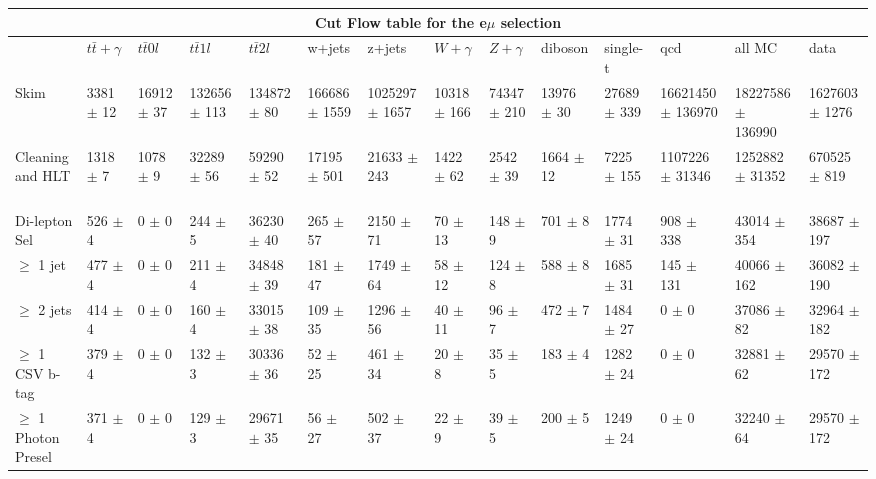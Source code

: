 \begin{table}
  \centering
\resizebox{\columnwidth}{!} {

\begin{tabular}{|l|l|l|l|l|l|l|l|l|l|l|l|l|l|}
\hline
\multicolumn{14}{|c|}{\textbf{Cut Flow table for the e$\mu$ selection}} \\
\hline
 & $t\bar{t}+\gamma$ & $t\bar{t} 0l$ & $t\bar{t} 1l$ & $t\bar{t} 2l$ & w+jets & z+jets & $W+\gamma$ & $Z+\gamma$ & diboson & single-t & qcd & all MC & data \\
\hline 
Skim & 3381 $\pm$ 12 \ & 16912 $\pm$ 37 \ & 132656 $\pm$ 113 \ & 134872 $\pm$ 80 \ & 166686 $\pm$ 1559 \ & 1025297 $\pm$ 1657 \ & 10318 $\pm$ 166 \ & 74347 $\pm$ 210 \ & 13976 $\pm$ 30 \ & 27689 $\pm$ 339 \ & 16621450 $\pm$ 136970 \ & 18227586 $\pm$ 136990\ & 1627603 $\pm$ 1276 \\
Cleaning and HLT & 1318 $\pm$ 7 \ & 1078 $\pm$ 9 \ & 32289 $\pm$ 56 \ & 59290 $\pm$ 52 \ & 17195 $\pm$ 501 \ & 21633 $\pm$ 243 \ & 1422 $\pm$ 62 \ & 2542 $\pm$ 39 \ & 1664 $\pm$ 12 \ & 7225 $\pm$ 155 \ & 1107226 $\pm$ 31346 \ & 1252882 $\pm$ 31352\ & 670525 $\pm$ 819 \\
Di-lepton Sel & 526 $\pm$ 4 \ & 0 $\pm$ 0 \ & 244 $\pm$ 5 \ & 36230 $\pm$ 40 \ & 265 $\pm$ 57 \ & 2150 $\pm$ 71 \ & 70 $\pm$ 13 \ & 148 $\pm$ 9 \ & 701 $\pm$ 8 \ & 1774 $\pm$ 31 \ & 908 $\pm$ 338 \ & 43014 $\pm$ 354\ & 38687 $\pm$ 197 \\
$\geq$ 1 jet & 477 $\pm$ 4 \ & 0 $\pm$ 0 \ & 211 $\pm$ 4 \ & 34848 $\pm$ 39 \ & 181 $\pm$ 47 \ & 1749 $\pm$ 64 \ & 58 $\pm$ 12 \ & 124 $\pm$ 8 \ & 588 $\pm$ 8 \ & 1685 $\pm$ 31 \ & 145 $\pm$ 131 \ & 40066 $\pm$ 162\ & 36082 $\pm$ 190 \\
$\geq$ 2 jets & 414 $\pm$ 4 \ & 0 $\pm$ 0 \ & 160 $\pm$ 4 \ & 33015 $\pm$ 38 \ & 109 $\pm$ 35 \ & 1296 $\pm$ 56 \ & 40 $\pm$ 11 \ & 96 $\pm$ 7 \ & 472 $\pm$ 7 \ & 1484 $\pm$ 27 \ & 0 $\pm$ 0 \ & 37086 $\pm$ 82\ & 32964 $\pm$ 182 \\
$\geq$ 1 CSV b-tag & 379 $\pm$ 4 \ & 0 $\pm$ 0 \ & 132 $\pm$ 3 \ & 30336 $\pm$ 36 \ & 52 $\pm$ 25 \ & 461 $\pm$ 34 \ & 20 $\pm$ 8 \ & 35 $\pm$ 5 \ & 183 $\pm$ 4 \ & 1282 $\pm$ 24 \ & 0 $\pm$ 0 \ & 32881 $\pm$ 62\ & 29570 $\pm$ 172 \\
$\geq$ 1 Photon Presel & 371 $\pm$ 4 \ & 0 $\pm$ 0 \ & 129 $\pm$ 3 \ & 29671 $\pm$ 35 \ & 56 $\pm$ 27 \ & 502 $\pm$ 37 \ & 22 $\pm$ 9 \ & 39 $\pm$ 5 \ & 200 $\pm$ 5 \ & 1249 $\pm$ 24 \ & 0 $\pm$ 0 \ & 32240 $\pm$ 64\ & 29570 $\pm$ 172 \\

\end{tabular}}
\end{table}
